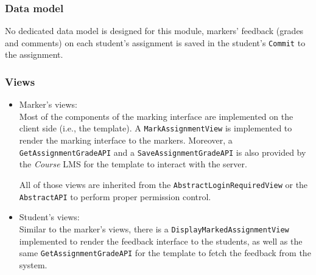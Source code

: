 \subsubsection{Data model}
No dedicated data model is designed for this module, markers' feedback
(grades and comments) on each student's assignment is saved in the student's
\texttt{Commit} to the assignment.

\subsubsection{Views}
    \begin{itemize}
        \item Marker's views: \\
        Most of the components of the marking interface are implemented on
        the client side (i.e., the template). A \texttt{MarkAssignmentView}
        is implemented to render the marking interface to the markers.
        Moreover, a \texttt{GetAssignmentGradeAPI} and a
        \texttt{SaveAssignmentGradeAPI} is also provided by the \emph{Course}
        LMS for the template to interact with the server.

        All of those views are inherited from the 
        \texttt{AbstractLoginRequiredView}
        or the \texttt{AbstractAPI} to perform proper permission control.

        \item Student's views: \\
        Similar to the marker's views, there is a
        \texttt{DisplayMarkedAssignmentView} implemented to render the feedback
        interface to the students, as well as the same 
        \texttt{GetAssignmentGradeAPI} for the template to fetch the feedback
        from the system.
    \end{itemize}


